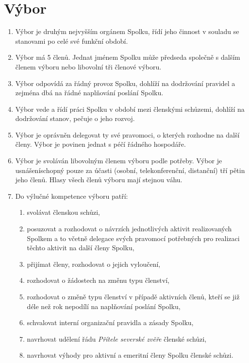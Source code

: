 \documentclass[11pt,a4paper]{article}
\begin{document}
\section{Výbor}
\begin{enumerate}[itemsep=0pt]
    \item Výbor je druhým nejvyšším orgánem Spolku, řídí jeho činnost v souladu 
    se stanovami po celé své funkční období. 
    \item Výbor má 5 členů. Jednat jménem Spolku může 
    předseda společně s dalším členem výboru nebo libovolní tři členové výboru.
    \item Výbor odpovídá za řádný provoz Spolku, dohlíží na dodržování pravidel 
    a zejména dbá na řádné naplňování poslání Spolku.
    \item Výbor vede a řídí práci Spolku v období mezi členskými schůzemi, 
    dohlíží na dodržování stanov, pečuje o jeho rozvoj.
    \item Výbor je oprávněn delegovat ty své pravomoci, o kterých rozhodne na 
    další členy. Výbor je povinen jednat s péčí řádného hospodáře. 
    \item Výbor je svoláván libovolným členem výboru podle potřeby. Výbor je 
    usnášeníschopný pouze za účasti (osobní, telekonferenční, distanční) tří pětin jeho členů. Hlasy všech členů 
    výboru mají stejnou váhu.
    \item Do výlučné kompetence výboru patří: 
    \begin{enumerate}[itemsep=0pt,topsep=0pt]
        \item svolávat členskou schůzi, 
        \item posuzovat a rozhodovat o návrzích jednotlivých aktivit 
        realizovaných Spolkem a to včetně delegace svých pravomocí potřebných 
        pro realizaci těchto aktivit na další členy Spolku,
        \item přijímat členy, rozhodovat o jejich 
        vyloučení,
	\item rozhodovat o žádostech na změnu typu členství,
	\item rozhodovat o změně typu členství v případě aktivních členů, kteří se již déle než rok nepodílí na naplňování poslání Spolku,
        \item schvalovat interní organizační pravidla a zásady Spolku,
        \item navrhovat udělení řádu \textit{Přítele severské zvěře} členské schůzi,
        \item navrhovat výhody pro aktivní a emeritní členy Spolku členské schůzi.
    \end{enumerate}
\end{enumerate}
\end{document}
